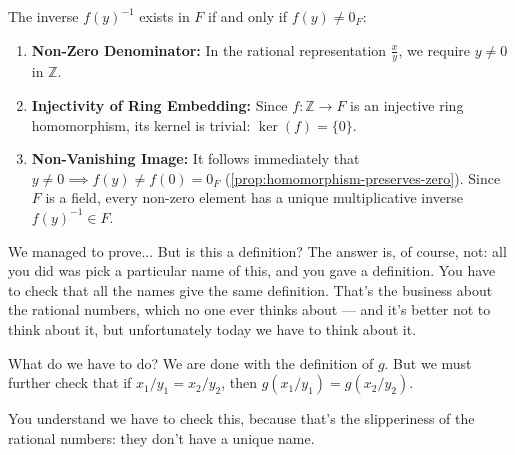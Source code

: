 \begin{content}

\begin{steps}
The inverse $f(y)^{-1}$ exists in $F$ if and only if $f(y) \ne 0_F$:
\begin{enumerate}[label=\textbf{(\arabic*)}]
    \setcounter{enumi}{0} \item \textbf{Non-Zero Denominator:} In the rational representation $\frac{x}{y}$, we require $y \ne 0$ in $\mathbb{Z}$.
    \setcounter{enumi}{1} \item \textbf{Injectivity of Ring Embedding:} Since $f \colon \mathbb{Z} \to F$ is an injective ring homomorphism, its kernel is trivial: $\ker(f) = \{0\}$.
    \setcounter{enumi}{2} \item \textbf{Non-Vanishing Image:} It follows immediately that $y \ne 0 \implies f(y) \ne f(0) = 0_F$ (\cref{prop:homomorphism-preserves-zero}). Since $F$ is a field, every non-zero element has a unique multiplicative inverse $f(y)^{-1} \in F$.
\end{enumerate}
\end{steps}
\end{content}

\begin{speech}[00:23:11 - 00:25:18]
We managed to prove... But is this a definition? The answer is, of course, not: all you did was pick a particular name of this, and you gave a definition. You have to check that all the names give the same definition. That's the business about the rational numbers, which no one ever thinks about --- and it's better not to think about it, but unfortunately today we have to think about it.

What do we have to do?  We are done with the definition of $g$. But we must further check that if $x_1/y_1 = x_2/y_2$,  then $g(x_1/y_1) = g(x_2/y_2)$. 

You understand we have to check this, because that's the slipperiness of the rational numbers: they don't have a unique name.
\end{speech}

